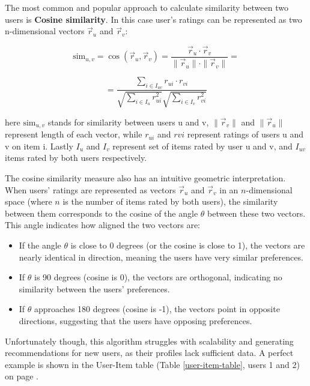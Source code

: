 \documentclass[10pt,a4paper]{article}
\begin{document}
The most common and popular approach to calculate similarity between two users is \textbf{Cosine similarity}. In this case user's ratings can be represented as two n-dimensional vectors $\vec{r}_u$ and $\vec{r}_v$:

\[
\text{sim}_{u,v} = \cos(\vec{r}_u, \vec{r}_v) = \frac{\vec{r}_u \cdot \vec{r}_v}{\|\vec{r}_u\| \cdot \|\vec{r}_v\|} =
\]

\[
= \frac{\sum_{i \in I_{uv}} r_{ui} \cdot r_{vi}}{\sqrt{\sum_{i \in I_u} r_{ui}^2} \sqrt{\sum_{i \in I_v} r_{vi}^2}}
\]

\hspace{0.1cm}

here $\text{sim}_{u,v}$ stands for similarity between users u and v, $\|\vec{r}_v\|$ and $\|\vec{r}_u\|$ represent length of each vector, while $r_{ui}$ and $r{vi}$ represent ratings of users u and v on item i. Lastly $I_{u}$ and $I_{v}$ represent set of items rated by user u and v, and $I_{uv}$ items rated by both users respectively. \cite{formulas}

The cosine similarity measure also has an intuitive geometric interpretation. When users’ ratings are represented as vectors 
$\vec{r}_u$ and $\vec{r}_v$ in an $n$-dimensional space (where $n$ is the number of items rated by both users), the similarity between them corresponds to the cosine of the angle $\theta$ between these two vectors. This angle indicates how aligned the two vectors are:

\begin{itemize}
    \item If the angle $\theta$ is close to 0 degrees (or the cosine is close to 1), the vectors are nearly identical in direction, meaning the users have very similar preferences.
    \item If $\theta$ is 90 degrees (cosine is 0), the vectors are orthogonal, indicating no similarity between the users' preferences.
    \item If $\theta$ approaches 180 degrees (cosine is -1), the vectors point in opposite directions, suggesting that the users have opposing preferences.
\end{itemize}

Unfortunately though, this algorithm struggles with scalability and generating recommendations for new users, as their profiles lack sufficient data. A perfect example is shown in the User-Item table (Table \ref{user-item-table}, users 1 and 2) on page \pageref{user-item-table}. \cite{10.1155/2009/421425}
\end{document}
